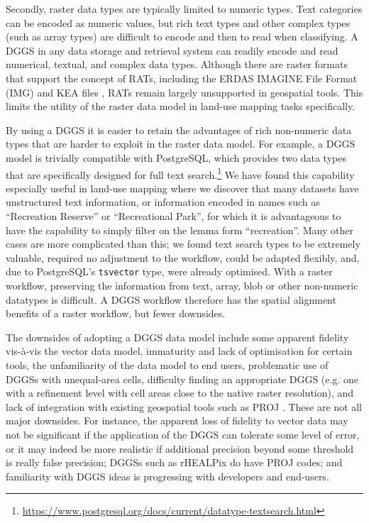 \documentclass[]{interact}
\theoremstyle{plain}%
\theoremstyle{definition}
\theoremstyle{remark}
\begin{document}
Secondly, raster data types are typically limited to numeric types. Text categories can be encoded as numeric values, but rich text types and other complex types (such as array types) are difficult to encode and then to read when classifying. A \ac{DGGS} in any data storage and retrieval system can readily encode and read numerical, textual, and complex data types. Although there are raster formats that support the concept of \acp{RAT}, including the ERDAS IMAGINE File Format (IMG) and KEA files \citep{bunting2013}, \acp{RAT} remain largely unsupported in geospatial tools. This limits the utility of the raster data model in land-use mapping tasks specifically.

By using a \ac{DGGS} it is easier to retain the advantages of rich non-numeric data types that are harder to exploit in the raster data model. For example, a \ac{DGGS} model is trivially compatible with PostgreSQL, which provides two data types that are specifically designed for full text search.\footnote{\url{https://www.postgresql.org/docs/current/datatype-textsearch.html}} We have found this capability especially useful in land-use mapping where we discover that many datasets have unstructured text information, or information encoded in names such as ``Recreation Reserve'' or ``Recreational Park'', for which it is advantageous to have the capability to simply filter on the lemma form ``recreation''. Many other cases are more complicated than this; we found text search types to be extremely valuable, required no adjustment to the workflow, could be adapted flexibly, and, due to PostgreSQL's \texttt{tsvector} type, were already optimised. With a raster workflow, preserving the information from text, array, blob or other non-numeric datatypes is difficult. A \ac{DGGS} workflow therefore has the spatial alignment benefits of a raster workflow, but fewer downsides.

The downsides of adopting a \ac{DGGS} data model include some apparent fidelity vis-\`{a}-vis the vector data model, immaturity and lack of optimisation for certain tools, the unfamiliarity of the data model to end users, problematic use of \acp{DGGS} with unequal-area cells, difficulty finding an appropriate \ac{DGGS} (e.g. one with a refinement level with cell areas close to the native raster resolution), and lack of integration with existing geospatial tools such as PROJ \citep{thompson2022ease}. These are not all major downsides. For instance, the apparent loss of fidelity to vector data may not be significant if the application of the \ac{DGGS} can tolerate some level of error, or it may indeed be more realistic if additional precision beyond some threshold is really false precision; \acp{DGGS} such as rHEALPix do have PROJ codes; and familiarity with \ac{DGGS} ideas is progressing with developers and end-users.
\end{document}
